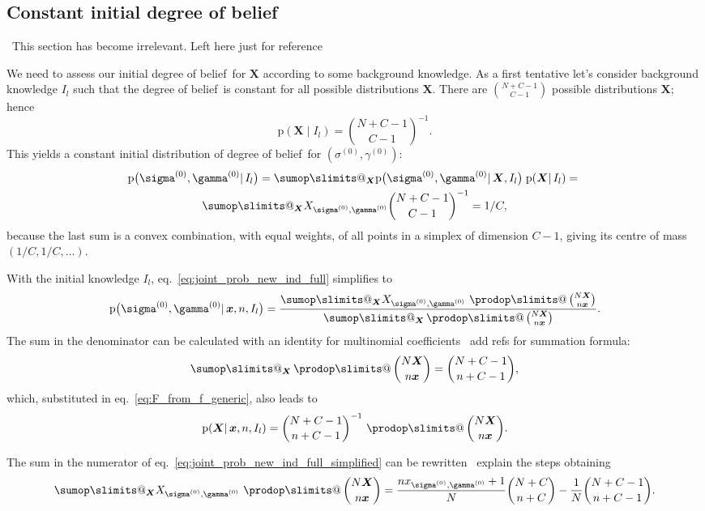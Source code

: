 \documentclass[\ifafour a4paper,12pt,\else a5paper,10pt,\fi%
onecolumn,oneside,article,%
british%
]{memoir}
\makeatletter
\theoremstyle{remark}
\theoremstyle{innote}
\def\sum{\DOTSI\sumop\slimits@}
\def\prod{\DOTSI\prodop\slimits@}
\newcommand*{\pf}{\mathrm{p}}%
\renewcommand*{\|}{\mathpunct{|}}
\newcommand*{\eqn}{eq.}%
\newcommand*{\tprod}{\mathop{\textstyle\prod}\nolimits}
\newcommand*{\puzzle}{\maltese}
\newcommand{\mynote}[1]{ {\color{notecolour}\puzzle\ #1}}
\newcommand*{\dob}{degree of belief}
\newcommand*{\yprod}{\tprod}
\newcommand*{\ys}{\sigma}
\newcommand*{\yg}{\gamma}
\newcommand*{\gn}{l}
\newcommand*{\ysi}[1]{\ys^{(#1)}}
\newcommand*{\ygi}[1]{\yg^{(#1)}}
\newcommand*{\yso}{\ysi{0}}
\newcommand*{\ygo}{\ygi{0}}
\newcommand*{\yF}{\bm{X}}
\newcommand*{\yf}{\bm{x}}
\newcommand*{\yIc}{I_{\gn}}
\makeatother
\begin{document}
\subsection*{Constant initial \dob}
\label{sec:first_calc_const_prior}
\mynote{This section has become irrelevant. Left here just for reference}

We need to assess our initial \dob\ for $\yF$ according to some
background knowledge. As a first tentative let's consider background
knowledge $\yIc$ such that the \dob\ is constant for all possible
distributions $\yF$. There are $\binom{N+C-1}{C-1}$ possible distributions
$\yF$; hence
\begin{equation}
  \label{eq:constant_prior}
  \pf(\yF \| \yIc) = \binom{N+C-1}{C-1}^{-1}.
\end{equation}
This yields a constant  initial  distribution of \dob\ for $(\yso,\ygo)$:
\begin{multline}
  \label{eq:joint_prob_initial_F_unknown}
  \pf\bigl(\yso, \ygo \| \yIc\bigr)  =
  \sum_{\yF}  \pf\bigl(\yso, \ygo \| \yF,\yIc\bigr) \;
  \pf( \yF \| \yIc) ={}\\
  \sum_{\yF}  X_{\yso, \ygo} \binom{N+C-1}{C-1}^{-1}
  = 1/C,
\end{multline}
because the last sum is a convex combination, with equal weights, of all
points in a simplex of dimension $C-1$, giving its centre of mass
$(1/C, 1/C, \dotso)$.

With the initial knowledge $\yIc$,
\eqn~\eqref{eq:joint_prob_new_ind_full} simplifies to
\begin{equation}
    \label{eq:joint_prob_new_ind_full_simplified}
  \pf\bigl(\yso, \ygo \| \yf, n,\yIc\bigr)  =
  \frac{
    \sum_{\yF} X_{\yso, \ygo}\,
    \yprod\binom{N\yF}{n\yf}}{
  \sum_{\yF} \yprod\binom{N\yF}{n\yf}}.
\end{equation}
The sum in the denominator can be calculated with an identity for
multinomial coefficients\mynote{add
  refs for summation formula}:
\begin{equation}
  \label{eq:multinomial_sum_identity}
  \sum_{\yF} \yprod\binom{N\yF}{n\yf} = \binom{N+C-1}{n+C-1},
\end{equation}
which, substituted in \eqn~\eqref{eq:F_from_f_generic}, also leads to
\begin{equation}
  \label{eq:F_from_f_specific}
  \pf(\yF \| \yf, n, \yIc) = \binom{N+C-1}{n+C-1}^{-1}\,\yprod\binom{N\yF}{n\yf}.
\end{equation}

The sum in the numerator of
\eqn~\eqref{eq:joint_prob_new_ind_full_simplified} can be
rewritten\mynote{explain the steps} obtaining
\begin{equation}
  \label{eq:numerator_constant_prior}
  \sum_{\yF} X_{\yso, \ygo}\, \yprod\binom{N\yF}{n\yf}
  =
  \frac{n x_{\yso, \ygo}+1}{N} \binom{N+C}{n+C}
  - \frac{1}{N}\binom{N+C-1}{n+C-1}.
\end{equation}
\end{document}
